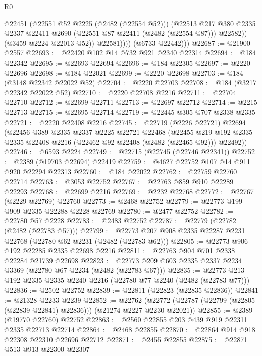 \begin{lexlean}{R0}
\begin{coremodule}
                    @22451
                    (@22551 @52 @2225 (@2482 (@22554 @52)))
                    (@22513
                      @217
                      @380
                      @2335
                      @2337
                      @22411
                      @2690
                      (@22551 @87 @22411 (@2482 (@22554 @87)))
                      @22582))
                  (@3459 @2224 @22013 @52))
                @22581))))
        (@6733 @22442)))
@22687 := @21900 @2557
@22693 := @22420 @102 @14 @732 @921 @2340 @22314
@22694 := @184 @22342
@22695 := @22693 @22694
@22696 := @184 @22305
@22697 := @2220 @22696
@22698 := @184 @22021
@22699 := @2220 @22698
@22703 := @184 (@3148 @22342 @22022 @52)
@22704 := @2220 @22703
@22708 := @184 (@3217 @22342 @22022 @52)
@22710 := @2220 @22708 @2216
@22711 := @22704 @22710
@22712 := @22699 @22711
@22713 := @22697 @22712
@22714 := @2215 @22713
@22715 := @22695 @22714
@22719 := @22445 @305 @707 @2338 @2335
@22721 := @2220 @22408 @2216
@22745 := @22719
    (@2226 @22721)
    @22694
    (@22456
      @389
      @2335
      @2337
      @2225
      @22721
      @22468
      (@22455 @219 @192 @2335 @2335 @22408 @2216 (@22462 @92 @22408 (@2482 (@22465 @92))) @22492))
@22746 := @6593 @2224
@22749 := @22715 (@22745 (@22746 @22341))
@22752 := @2389 (@19703 @22694) @22419
@22759 := @4627 @22752 @107 @14 @911 @920 @22294 @22313
@22760 := @184 @22022
@22762 := @22759 @22760 @22714
@22763 := @3053 @22752
@22767 := @22763 @859 @910 @22289 @22293
@22768 := @22699 @2216
@22769 := @2232 @22768
@22772 := @22767 (@2229 @22769) @22760
@22773 := @2468 @22752
@22779 := @22773 @199 @909 @2335 @22288 @2228 @22769
@22780 := @2477 @22752
@22782 := @22780 @57 @2228
@22783 := @2483 @22752
@22787 := @22779 (@22782 (@2482 (@22783 @57)))
@22799 := @22773 @207 @908 @2335 @22287 @2231 @22768 (@22780 @62 @2231 (@2482 (@22783 @62)))
@22805 := @22773 @906 @192 @22285 @2335 @22698 @2216
@22811 := @22763 @904 @701 @2338 @22284 @21739 @22698
@22823 := @22773 @209 @603 @2335 @2337 @2234 @3369 (@22780 @67 @2234 (@2482 (@22783 @67)))
@22835 := @22773 @213 @192 @2335 @2335 @2240 @2216 (@22780 @77 @2240 (@2482 (@22783 @77)))
@22836 := @2502 @22752
@22839 := @22811 (@22823 (@22835 @22836))
@22841 := @21328 @2233 @2239
@22852 := @22762
    (@22772 (@22787 (@22799 (@22805 (@22839 @22841) @22836))) (@21274 @2227 @2230 @22021))
@22855 := @2389 (@19770 @22760) @22752
@22863 := @2560 @22855 @203 @439 @919 @22311 @2335 @22713 @22714
@22864 := @2468 @22855
@22870 := @22864 @914 @918 @22308 @22310 @22696 @22712
@22871 := @2455 @22855
@22875 := @22871 @513 @913 @22300 @22307

\end{coremodule}
\end{lexlean}
